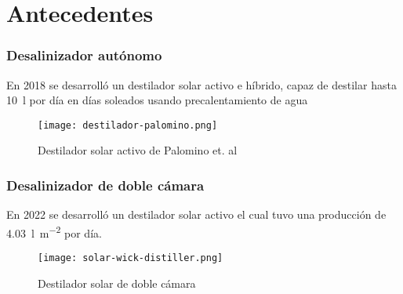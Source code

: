 \section{Antecedentes}

\begin{frame}
	\frametitle{Desalinizador autónomo}
	En 2018 se desarrolló un destilador solar activo e híbrido, capaz de destilar hasta \SI{10}{\litre} por día en días soleados usando precalentamiento de agua\\
	\begin{figure}
		\centering
		\texttt{[image: destilador-palomino.png]}
		\caption{Destilador solar activo de Palomino et. al}
		{\scriptsize{}}
	\end{figure}
\end{frame}


\begin{frame}
	\frametitle{Desalinizador de doble cámara}
	En 2022 se desarrolló un destilador solar activo el cual tuvo una producción de \qty{4.03}{\litre\per\metre\tothe{2}} por día.\\
	\begin{figure}
		\centering
		\texttt{[image: solar-wick-distiller.png]}
		\caption{Destilador solar de doble cámara}
		{\scriptsize{}}
	\end{figure}
\end{frame}
